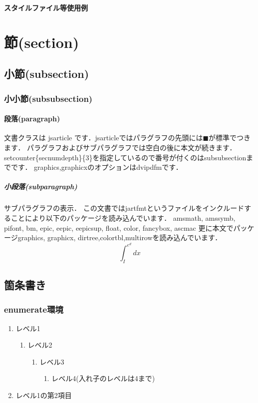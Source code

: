 \documentclass[a4paper,10pt]{jsarticle}
\begin{document}
\renewcommand\citeform[1]{#1)}%

\begin{titlepage}
\rightline{\today}
\centerline{\Large\bfseries スタイルファイル等使用例}
\tableofcontents
\end{titlepage}
\clearpage

\setcounter{page}{1}



\section{節(section)}
\subsection{小節(subsection)}
\subsubsection{小小節(subsubsection)}
\paragraph{段落(paragraph)}
文書クラスは jsarticle です．jsarticleではパラグラフの先頭には$\blacksquare$が標準でつきます．
パラグラフおよびサブパラグラフでは空白の後に本文が続きます．
setcounter\{secnumdepth\}\{3\}を指定しているので番号が付くのはsubsubsectionまでです．
graphics,graphicxのオプションはdvipdfmです．

\subparagraph{小段落(subparagraph)}
サブパラグラフの表示．
この文書ではjartfmtというファイルをインクルードすることにより以下のパッケージを読み込んでいます．
amsmath, amssymb, pifont, bm, epic, eepic, eepicsup, float, color, fancybox, ascmac
更に本文でパッケージgraphics, graphicx, dirtree,colortbl,multirowを読み込んでいます．
\[ \int_I^{e^d}dx \]


\subsection{箇条書き}
\subsubsection{enumerate環境}
\begin{enumerate}
\item レベル1
  \begin{enumerate}
  \item レベル2
    \begin{enumerate}
    \item レベル3
      \begin{enumerate}
      \item レベル4(入れ子のレベルは4まで)
      \end{enumerate}
    \end{enumerate}
  \end{enumerate}
\item レベル1の第2項目
\end{enumerate}
\end{document}
